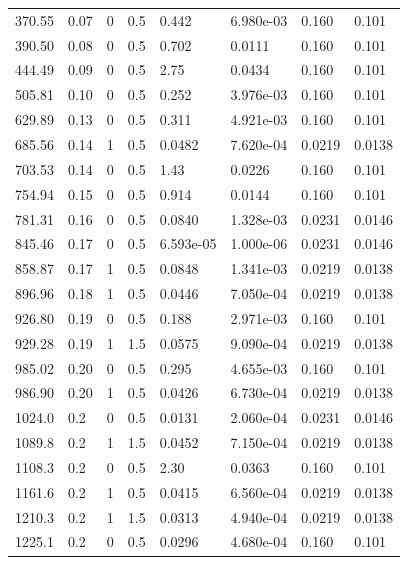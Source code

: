 \documentclass[preview]{standalone}
\begin{document}
{{\begin{tabular}{L{1.2cm}C{1.2cm} C{0.3cm}C{0.5cm} C{1.4cm}C{1.4cm} C{1.4cm}C{1.4cm}}
  370.55  &  0.07  & 0     & 0.5 &  0.442  & 6.980e-03  & 0.160 &  0.101   \\ 
  390.50  &  0.08  & 0     & 0.5 &  0.702  & 0.0111  & 0.160 &  0.101   \\ 
  444.49  &  0.09  & 0     & 0.5 &  2.75  & 0.0434  & 0.160 &  0.101   \\ 
  505.81  &  0.10  & 0     & 0.5 &  0.252  & 3.976e-03  & 0.160 &  0.101   \\ 
  629.89  &  0.13  & 0     & 0.5 &  0.311  & 4.921e-03  & 0.160 &  0.101   \\ 
  685.56  &  0.14  & 1     & 0.5 &  0.0482  & 7.620e-04  & 0.0219 &  0.0138   \\ 
  703.53  &  0.14  & 0     & 0.5 &  1.43  & 0.0226  & 0.160 &  0.101   \\ 
  754.94  &  0.15  & 0     & 0.5 &  0.914  & 0.0144  & 0.160 &  0.101   \\ 
  781.31  &  0.16  & 0     & 0.5 &  0.0840  & 1.328e-03  & 0.0231 &  0.0146   \\ 
  845.46  &  0.17  & 0     & 0.5 &  6.593e-05  & 1.000e-06  & 0.0231 &  0.0146   \\ 
  858.87  &  0.17  & 1     & 0.5 &  0.0848  & 1.341e-03  & 0.0219 &  0.0138   \\ 
  896.96  &  0.18  & 1     & 0.5 &  0.0446  & 7.050e-04  & 0.0219 &  0.0138   \\ 
  926.80  &  0.19  & 0     & 0.5 &  0.188  & 2.971e-03  & 0.160 &  0.101   \\ 
  929.28  &  0.19  & 1     & 1.5 &  0.0575  & 9.090e-04  & 0.0219 &  0.0138   \\ 
  985.02  &  0.20  & 0     & 0.5 &  0.295  & 4.655e-03  & 0.160 &  0.101   \\ 
  986.90  &  0.20  & 1     & 0.5 &  0.0426  & 6.730e-04  & 0.0219 &  0.0138   \\ 
  1024.0  &   0.2  & 0     & 0.5 &  0.0131  & 2.060e-04  & 0.0231 &  0.0146   \\ 
  1089.8  &   0.2  & 1     & 1.5 &  0.0452  & 7.150e-04  & 0.0219 &  0.0138   \\ 
  1108.3  &   0.2  & 0     & 0.5 &  2.30  & 0.0363  & 0.160 &  0.101   \\ 
  1161.6  &   0.2  & 1     & 0.5 &  0.0415  & 6.560e-04  & 0.0219 &  0.0138   \\ 
  1210.3  &   0.2  & 1     & 1.5 &  0.0313  & 4.940e-04  & 0.0219 &  0.0138   \\ 
  1225.1  &   0.2  & 0     & 0.5 &  0.0296  & 4.680e-04  & 0.160 &  0.101   \\ 

\end{tabular}}}
\end{document}
